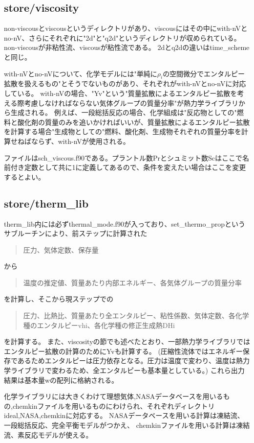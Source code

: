 \documentclass{jsarticle}
\begin{document}
\subsection{store/viscosity}%
non-viscousとviscousというディレクトリがあり、viscousにはその中にwith-nVとno-nV、さらにそれぞれに"2d"と"q2d"というディレクトリが収められている。
non-viscousが非粘性流、viscousが粘性流である。
2dとq2dの違いはtime\_schemeと同じ。

with-nVとno-nVについて、化学モデルには"単純に$\rho_i$の空間微分でエンタルピー拡散を扱えるもの"とそうでないものがあり、それぞれがwith-nVとno-nVに対応している。
with-nVの場合、"Yv"という"質量拡散によるエンタルピー拡散を考える際考慮しなければならない気体グループの質量分率"が熱力学ライブラリから生成される。
例えば、一段総括反応の場合、化学組成は"反応物としての"燃料と酸化剤の質量のみを追いかければいいが、質量拡散によるエンタルピー拡散を計算する場合"生成物としての"燃料、酸化剤、生成物それぞれの質量分率を計算せねばならず、with-nVが使用される。

ファイルはsch\_viscous.f90である。プラントル数Prとシュミット数Scはここで名前付き定数として共に1に定義してあるので、条件を変えたい場合はここを変更するとよい。
\subsection{store/therm\_lib}%
therm\_lib内には必ずthermal\_mode.f90が入っており、set\_thermo\_propというサブルーチンにより、前ステップに計算された
\begin{quotation}
圧力、気体定数、保存量
\end{quotation}
から
\begin{quotation}
温度の推定値、質量あたり内部エネルギー、各気体グループの質量分率
\end{quotation}
を計算し、そこから現ステップでの
\begin{quotation}
圧力、比熱比、質量あたり全エンタルピー、粘性係数、気体定数、各化学種のエンタルピーvhi、各化学種の修正生成熱DHi
\end{quotation}
を計算する。
また、viscosityの節でも述べたとおり、一部熱力学ライブラリではエンタルピー拡散の計算のためにYvも計算する。
(圧縮性流体ではエネルギー保存であるためエンタルピーは圧力依存となる。圧力は温度で変わり、温度は熱力学ライブラリで変わるため、全エンタルピーも基本量としている。)
これら出力結果は基本量wの配列に格納される。

化学ライブラリには大きくわけて理想気体,NASAデータベースを用いるもの,chemkinファイルを用いるものにわけられ、それぞれディレクトリideal,NASA,chemkinに対応する。
NASAデータベースを用いる計算は凍結流、一段総括反応、完全平衡モデルがつかえ、
chemkinファイルを用いる計算は凍結流、素反応モデルが使える。
\end{document}
